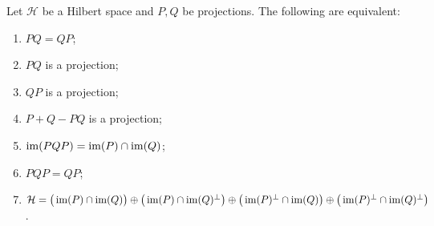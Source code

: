 \begin{proposition} \label{commutingProjectors}
Let $\mathcal{H}$ be a Hilbert space and $P,Q$ be projections. The following are equivalent:
\begin{enumerate}
\item $PQ = QP$;
\item $PQ$ is a projection;
\item $QP$ is a projection;
\item $P+Q-PQ$ is a projection;
\item $\operatorname{im}(PQP) = \operatorname{im}(P) \cap \operatorname{im}(Q)$;
\item $PQP = QP$;
\item $\mathcal{H} = \big(\operatorname{im}(P)\cap\operatorname{im}(Q)\big)\oplus \big(\operatorname{im}(P)\cap\operatorname{im}(Q)^\perp\big) \oplus \big(\operatorname{im}(P)^\perp\cap\operatorname{im}(Q)\big) \oplus \big(\operatorname{im}(P)^\perp\cap\operatorname{im}(Q)^\perp\big)$.
\end{enumerate}
\end{proposition}
